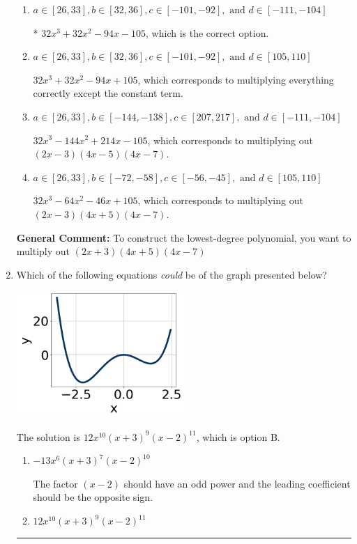 \documentclass{extbook}[14pt]
\newcommand{\litem}[1]{\item #1

\rule{\textwidth}{0.4pt}}
\begin{document}
\begin{enumerate}
{\begin{enumerate}[label=\Alph*.]
$32x^{3} -32 x^{2} -94 x + 105$, which corresponds to multiplying out $(2x -3)(4x -5)(4x + 7)$.
\item \( a \in [26, 33], b \in [32, 36], c \in [-101, -92], \text{ and } d \in [-111, -104] \)

* $32x^{3} +32 x^{2} -94 x -105$, which is the correct option.
\item \( a \in [26, 33], b \in [32, 36], c \in [-101, -92], \text{ and } d \in [105, 110] \)

$32x^{3} +32 x^{2} -94 x + 105$, which corresponds to multiplying everything correctly except the constant term.
\item \( a \in [26, 33], b \in [-144, -138], c \in [207, 217], \text{ and } d \in [-111, -104] \)

$32x^{3} -144 x^{2} +214 x -105$, which corresponds to multiplying out $(2x -3)(4x -5)(4x -7)$.
\item \( a \in [26, 33], b \in [-72, -58], c \in [-56, -45], \text{ and } d \in [105, 110] \)

$32x^{3} -64 x^{2} -46 x + 105$, which corresponds to multiplying out $(2x -3)(4x + 5)(4x -7)$.
\end{enumerate}

\textbf{General Comment:} To construct the lowest-degree polynomial, you want to multiply out $(2x + 3)(4x + 5)(4x -7)$
}
\litem{
Which of the following equations \textit{could} be of the graph presented below?

\begin{center}
    \includegraphics[width=0.5\textwidth]{../Figures/polyGraphToFunctionC.png}
\end{center}




The solution is \( 12x^{10} (x + 3)^{9} (x - 2)^{11} \), which is option B.\begin{enumerate}[label=\Alph*.]
\item \( -13x^{6} (x + 3)^{7} (x - 2)^{10} \)

The factor $(x - 2)$ should have an odd power and the leading coefficient should be the opposite sign.
\item \( 12x^{10} (x + 3)^{9} (x - 2)^{11} \)


\end{enumerate}}
\end{enumerate}
\end{document}
